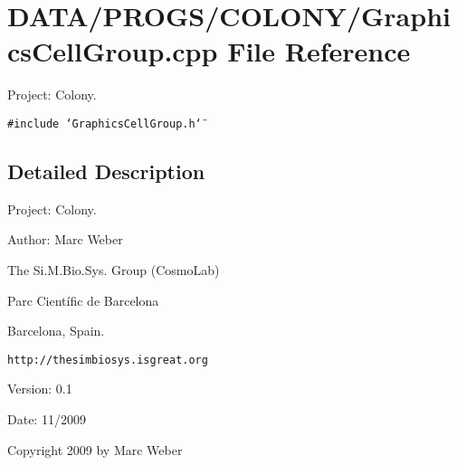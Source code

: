 \section{DATA/PROGS/COLONY/GraphicsCellGroup.cpp File Reference}
\label{GraphicsCellGroup_8cpp}
Project: Colony. 

{\tt \#include \char`\"{}GraphicsCellGroup.h\char`\"{}}\par


\subsection{Detailed Description}
Project: Colony. 

\begin{Desc}
\item[Author:]Marc Weber\par
 The Si.M.Bio.Sys. Group (CosmoLab)\par
 Parc Científic de Barcelona\par
 Barcelona, Spain.\par
 {\tt http://thesimbiosys.isgreat.org} \end{Desc}
\begin{Desc}
\item[Version:]0.1 \end{Desc}
\begin{Desc}
\item[Date:]11/2009\end{Desc}
Copyright 2009 by Marc Weber 